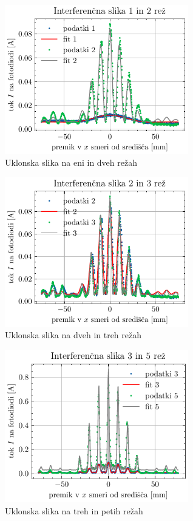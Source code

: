 \documentclass[12pt]{article}
\begin{document}
\begin{figure}[ht]
\begin{center}
    \includegraphics[width=8cm]{uklon12.pdf}
    \caption{Uklonska slika na eni in dveh režah}
    \label{1}
\end{center}
\end{figure}
\begin{figure}[ht]
\begin{center}
    \includegraphics[width=8cm]{uklon23.pdf}
    \caption{Uklonska slika na dveh in treh režah}
    \label{2}
\end{center}
\end{figure}
\begin{figure}[ht]
\begin{center}
    \includegraphics[width=8cm]{uklon35.pdf}
    \caption{Uklonska slika na treh in petih režah}
    \label{3}
\end{center}
\end{figure}
\end{document}

